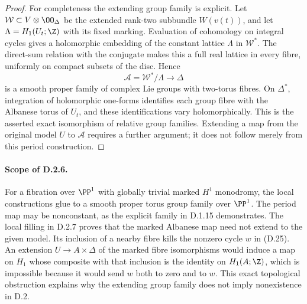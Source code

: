 \begin{proof}
For completeness the extending group family is explicit.
Let $\mathcal W\subset V\otimes\OO_\Delta$ be the extended
rank-two subbundle $W(v(t))$, and let
$\Lambda=H_1(U_t;\Z)$ with its fixed marking. Evaluation of
cohomology on integral cycles gives a holomorphic embedding
of the constant lattice $\Lambda$ in $\mathcal W^*$.
The direct-sum relation with the conjugate makes this a full
real lattice in every fibre, uniformly on compact subsets of
the disc. Hence
\[
 \mathcal A=\mathcal W^*/\Lambda\longrightarrow\Delta
\]
is a smooth proper family of complex Lie groups with
two-torus fibres. On $\Delta^*$, integration of holomorphic
one-forms identifies each group fibre with the Albanese torus
of $U_t$, and these identifications vary holomorphically.
This is the asserted exact isomorphism of relative group
families. Extending a map from the original model $U$ to
$\mathcal A$ requires a further argument; it does not follow
merely from this period construction.
\end{proof}

\paragraph{Scope of D.2.6.}
For a fibration over $\PP^1$ with globally trivial marked
$H^1$ monodromy, the local constructions glue to a smooth
proper torus group family over $\PP^1$. The period map may
be nonconstant, as the explicit family in D.1.15 demonstrates.
The local filling in D.2.7 proves that the marked Albanese
map need not extend to the given model. Its inclusion of
a nearby fibre kills the nonzero cycle $w$ in (D.25).
An extension $U\to A\times\Delta$ of the marked fibre
isomorphisms would induce a map on $H_1$ whose composite
with that inclusion is the identity on $H_1(A;\Z)$,
which is impossible because it would send $w$ both to
zero and to $w$. This exact topological obstruction
explains why the extending group family does not imply
nonexistence in D.2.
